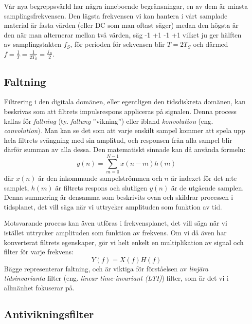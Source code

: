 \noindent
Vår nya begreppsvärld har några inneboende begränsningar, en av dem är minsta
samplingsfrekvensen.
Den lägsta frekvensen vi kan hantera i vårt samplade material är fasta värden
(eller DC som man oftast säger) medan den högsta är den när man alternerar
mellan två värden, säg -1 +1 -1 +1 vilket ju ger hälften av samplingstakten
\(f_S\), för perioden för sekvensen blir \(T = 2T_S\) och därmed
\(f=\frac{1}{T}=\frac{1}{2T_S}=\frac{f_S}{2}\).

\subsection{Faltning}

Filtrering i den digitala domänen, eller egentligen den tidsdiskreta domänen,
kan beskrivas som att filtrets impulsrespons appliceras på signalen. Denna
process kallas för \emph{faltning} (ty. \emph{faltung} ''vikning'') eller ibland
\emph{konvolution} (eng. \emph{convolution}).
Man kan se det som att varje enskilt sampel kommer att spela upp hela filtrets
svängning med sin amplitud, och responsen från alla sampel blir därför summan
av alla dessa.
Den matematiskt sinnade kan då använda formeln:
\[y(n) = \sum_{m=0}^{N-1} x(n-m)h(m)\]
där \(x(n)\) är den inkommande sampelströmmen och \(n\) är indexet för det
n:te samplet, \(h(m)\) är filtrets respons och slutligen \(y(n)\) är de utgående
samplen.
Denna summering är densamma som beskrivits ovan och skildrar processen
i tidsplanet, det vill säga när vi uttrycker amplituden som funktion av tid.

Motsvarande process kan även utföras i frekvensplanet, det vill säga när vi 
istället uttrycker amplituden som funktion av frekvens.
Om vi då även har konverterat filtrets egenskaper, gör vi helt enkelt en
multiplikation av signal och filter för varje frekvens:
\[Y(f) = X(f)H(f)\]
Bägge representerar faltning, och är viktiga för förståelsen av \emph{linjära
tidsinvarianta} filter (eng. \emph{linear time-invariant (LTI)}) filter,
som är det vi i allmänhet fokuserar på.

\subsection{Antivikningsfilter}

